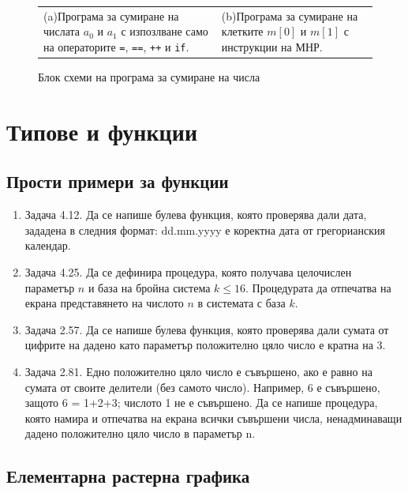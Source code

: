 \documentclass[12pt,a4paper]{article}
\newcommand{\code}[1]{\texttt{#1}}
\begin{document}
{\begin{figure}
\begin{tabular}{p{7cm} p{7cm}}
      \\
      (a)Програма за сумиране на числата $a_0$ и $a_1$ с изпозлване само на операторите \code{=}, \code{==}, \code{++} и \code{if}.
      &
      (b)Програма за сумиране на клетките $m[0]$ и $m[1]$ с инструкции на МНР.
  \end{tabular}

  \caption{Блок схеми на програма за сумиране на числа}
  \label{fig:mnr}
\end{figure}




\pagebreak

\section {Типове и функции}

\subsection {Прости примери за функции}

\begin{enumerate}[]
	\item Задача 4.12.\cite{sbornik} Да се напише булева функция, която проверява дали дата, зададена в следния формат: dd.mm.yyyy е коректна дата от грегорианския календар.
	\item Задача 4.25.\cite{sbornik} Да се дефинира процедура, която получава целочислен параметър $n$ и база на бройна система $k \leq 16$. Процедурата да отпечатва на екрана представянето на числото $n$ в системата с база $k$.
	\item Задача 2.57.\cite{sbornik}	Да се напише булева функция, която проверява дали сумата от цифрите на дадено като параметър положително цяло число е кратна на 3.
	\item Задача 2.81.\cite{sbornik} Едно положително цяло число е съвършено, ако е равно на сумата от своите делители (без самото число). Например, 6 е съвършено, защото 6 = 1+2+3; числото 1 не е съвършено. Да се напише процедура, която намира и отпечатва на екрана  всички съвършени числа, ненадминаващи дадено положително цяло число в параметър n.

\end{enumerate}

\subsection {Елементарна растерна графика}

}
\end{document}
